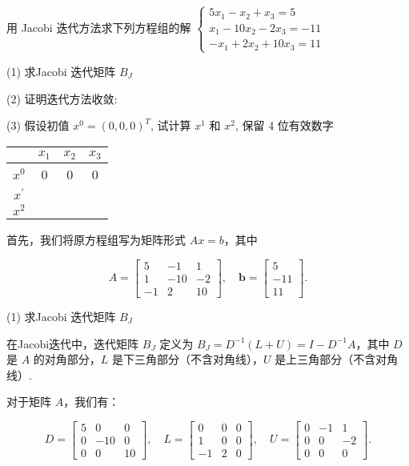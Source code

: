 \begin{tcolorbox}[enhanced,colback=10,colframe=9,breakable,coltitle=green!25!black,title=2024]
  
 用 Jacobi 迭代方法求下列方程组的解
$
\left\{\begin{array}{c}
5 x_{1}-x_{2}+x_{3}=5 \\
x_{1}-10 x_{2}-2 x_{3}=-11 \\
-x_{1}+2 x_{2}+10 x_{3}=11
\end{array}\right.
$

(1) 求Jacobi 迭代矩阵 $B_{J}$

(2) 证明迭代方法收敛:

(3) 假设初值 $ x^{0}=(0,0,0)^{T} $, 试计算 $ x^{1} $ 和 $ x^{2} $, 保留 4 位有效数字

\begin{center}
\begin{tabular}{|c|c|c|c|}
\hline & $ x_{1} $ & $ x_{2} $ & $ x_{3} $ \\
\hline$ x^{0} $ & 0 & 0 & 0 \\
\hline$ x^{\prime} $ & & & \\
\hline$ x^{2} $ & & & \\
\hline
\end{tabular}
\end{center}
\tcblower

首先，我们将原方程组写为矩阵形式 $A x = b$，其中

$$
A = \begin{bmatrix}
5 & -1 & 1 \\
1 & -10 & -2 \\
-1 & 2 & 10
\end{bmatrix}, \quad \boldsymbol{b} = \begin{bmatrix} 5 \\ -11 \\ 11 \end{bmatrix}.
$$

 (1) 求Jacobi 迭代矩阵 $B_J$

在Jacobi迭代中，迭代矩阵 $B_J$ 定义为 $B_J =D^{-1}(L+U)=I-D^{-1}A$，其中 $D$ 是 $A$ 的对角部分，$L$ 是下三角部分（不含对角线），$U$ 是上三角部分（不含对角线）.

对于矩阵 $A$，我们有：

$$
D = \begin{bmatrix} 5 & 0 & 0 \\ 0 & -10 & 0 \\ 0 & 0 & 10 \end{bmatrix}, \quad
L = \begin{bmatrix} 0 & 0 & 0 \\ 1 & 0 & 0 \\ -1 & 2 & 0 \end{bmatrix}, \quad
U = \begin{bmatrix} 0 & -1 & 1 \\ 0 & 0 & -2 \\ 0 & 0 & 0 \end{bmatrix}.
$$


\end{tcolorbox}
